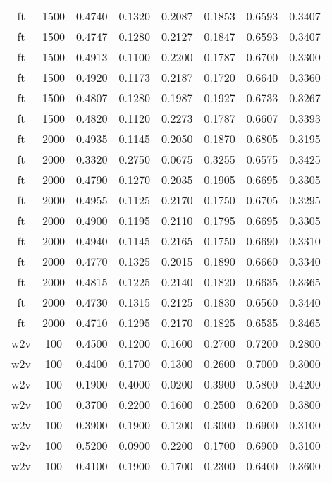 \begin{table}[h!]
\begin{tabularx}{\textwidth}{cccccccc}
		ft       & 1500 & 0.4740 & 0.1320 & 0.2087 & 0.1853 & 0.6593 & 0.3407 \\
		ft       & 1500 & 0.4747 & 0.1280 & 0.2127 & 0.1847 & 0.6593 & 0.3407 \\
		ft       & 1500 & 0.4913 & 0.1100 & 0.2200 & 0.1787 & 0.6700 & 0.3300 \\
		ft       & 1500 & 0.4920 & 0.1173 & 0.2187 & 0.1720 & 0.6640 & 0.3360 \\
		ft       & 1500 & 0.4807 & 0.1280 & 0.1987 & 0.1927 & 0.6733 & 0.3267 \\
		ft       & 1500 & 0.4820 & 0.1120 & 0.2273 & 0.1787 & 0.6607 & 0.3393 \\
		ft       & 2000 & 0.4935 & 0.1145 & 0.2050 & 0.1870 & 0.6805 & 0.3195 \\
		ft       & 2000 & 0.3320 & 0.2750 & 0.0675 & 0.3255 & 0.6575 & 0.3425 \\
		ft       & 2000 & 0.4790 & 0.1270 & 0.2035 & 0.1905 & 0.6695 & 0.3305 \\
		ft       & 2000 & 0.4955 & 0.1125 & 0.2170 & 0.1750 & 0.6705 & 0.3295 \\
		ft       & 2000 & 0.4900 & 0.1195 & 0.2110 & 0.1795 & 0.6695 & 0.3305 \\
		ft       & 2000 & 0.4940 & 0.1145 & 0.2165 & 0.1750 & 0.6690 & 0.3310 \\
		ft       & 2000 & 0.4770 & 0.1325 & 0.2015 & 0.1890 & 0.6660 & 0.3340 \\
		ft       & 2000 & 0.4815 & 0.1225 & 0.2140 & 0.1820 & 0.6635 & 0.3365 \\
		ft       & 2000 & 0.4730 & 0.1315 & 0.2125 & 0.1830 & 0.6560 & 0.3440 \\
		ft       & 2000 & 0.4710 & 0.1295 & 0.2170 & 0.1825 & 0.6535 & 0.3465 \\
		w2v      & 100  & 0.4500 & 0.1200 & 0.1600 & 0.2700 & 0.7200 & 0.2800 \\
		w2v      & 100  & 0.4400 & 0.1700 & 0.1300 & 0.2600 & 0.7000 & 0.3000 \\
		w2v      & 100  & 0.1900 & 0.4000 & 0.0200 & 0.3900 & 0.5800 & 0.4200 \\
		w2v      & 100  & 0.3700 & 0.2200 & 0.1600 & 0.2500 & 0.6200 & 0.3800 \\
		w2v      & 100  & 0.3900 & 0.1900 & 0.1200 & 0.3000 & 0.6900 & 0.3100 \\
		w2v      & 100  & 0.5200 & 0.0900 & 0.2200 & 0.1700 & 0.6900 & 0.3100 \\
		w2v      & 100  & 0.4100 & 0.1900 & 0.1700 & 0.2300 & 0.6400 & 0.3600 \\

\end{tabularx}
\end{table}
